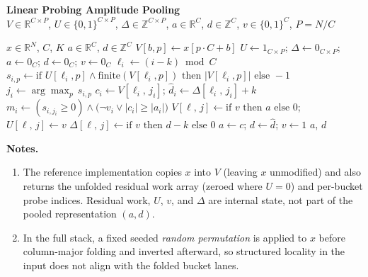 \documentclass[preview,border=8pt]{standalone}
\begin{document}
\begin{minipage}{0.92\linewidth}
{\large\bfseries Linear Probing Amplitude Pooling}\\[0.35em]
{\small
$V \in \mathbb{R}^{C \times P}$,
$U \in \{0,1\}^{C \times P}$,
$\Delta \in \mathbb{Z}^{C \times P}$,
$a \in \mathbb{R}^{C}$,
$d \in \mathbb{Z}^{C}$,
$v \in \{0,1\}^{C}$,
$P = N/C$
}

\begin{algorithmic}[1]
\Require $x \in \mathbb{R}^{N}$,\; $C$,\; $K$ 
\Ensure $a \in \mathbb{R}^{C}$,\; $d \in \mathbb{Z}^{C}$
\State $V[b, p] \gets x[p \cdot C + b]$ 
\State $U \gets 1_{C \times P}$;\;
       $\Delta \gets 0_{C \times P}$;\;
       $a \gets 0_{C}$;\;
       $d \gets 0_{C}$;\;
       $v \gets 0_{C}$
  \State $\ell_i \gets (i - k) \bmod C$
  \State $s_{i,p} \gets \text{if } U[\ell_i,p] \land \mathrm{finite}(V[\ell_i,p]) \text{ then } |V[\ell_i,p]| \text{ else } -1$
  \State $j_i \gets \arg\max_{p}\, s_{i,p}$
  \State $c_i \gets V[\ell_i,\, j_i]$;\;
         $\hat{d}_i \gets \Delta[\ell_i,\, j_i] + k$
  \State $m_i \gets (s_{i,j_i} \ge 0) \land \bigl(\neg v_i \lor |c_i| \ge |a_i|\bigr)$
    \State $V[\ell,\, j] \gets \text{if } v \text{ then } a \text{ else } 0$;\;
           $U[\ell,\, j] \gets v$
    \State $\Delta[\ell,\, j] \gets \text{if } v \text{ then } d - k \text{ else } 0$
    \State $a \gets c$;\;
           $d \gets \hat{d}$;\;
           $v \gets 1$
  \EndWhere
\EndFor
\State \Return $a$,\; $d$
\end{algorithmic}

\vspace{0.55em}
{\footnotesize
\textbf{Notes.}
\begin{enumerate}
  \itemsep0.25em
  \item The reference implementation copies $x$ into $V$ (leaving $x$ unmodified)
        and also returns the unfolded residual work array (zeroed where $U = 0$)
        and per-bucket probe indices. Residual work, $U$, $v$, and $\Delta$ are
        internal state, not part of the pooled representation $(a,d)$.
  \item In the full stack, a fixed seeded \emph{random permutation} is applied
        to $x$ before column-major folding and inverted afterward, so structured
        locality in the input does not align with the folded bucket lanes.
\end{enumerate}
}
\end{minipage}
\end{document}
